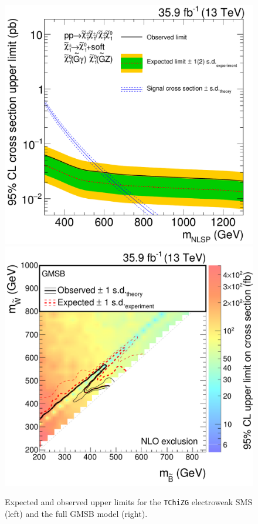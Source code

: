 \begin{figure}[tbp]
 \centering
 \includegraphics[width=\pairwidth]{figures/EndorsementPlots/TChiNG_limit2}
 \includegraphics[width=\pairwidth]{figures/EndorsementPlots/GMSB_limits_XSEC2}
 \caption{Expected and observed upper limits for the \texttt{TChiZG} electroweak SMS (left) and the full GMSB model (right).}
 \label{fig:limitEWK}
\end{figure}

